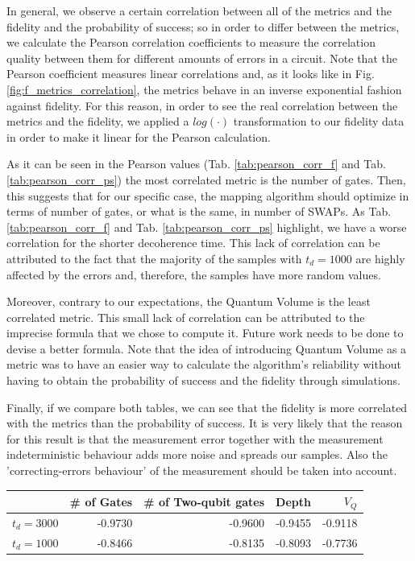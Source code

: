 In general, we observe a certain correlation between all of the metrics and the fidelity and the probability of success; so in order to differ between the metrics, we calculate the Pearson correlation coefficients to measure the correlation quality between them for different amounts of errors in a circuit.
Note that the Pearson coefficient measures linear correlations and, as it looks like in Fig. \ref{fig:f_metrics_correlation}, the metrics behave in an inverse exponential fashion against fidelity.
For this reason, in order to see the real correlation between the metrics and the fidelity, we applied a \(log(\cdot)\) transformation to our fidelity data in order to make it linear for the Pearson calculation.


As it can be seen in the Pearson values (Tab. \ref{tab:pearson_corr_f} and Tab. \ref{tab:pearson_corr_ps}) the most correlated metric is the number of gates.
Then, this suggests that for our specific case, the mapping algorithm should optimize in terms of number of gates, or what is the same, in number of SWAPs.
As Tab. \ref{tab:pearson_corr_f} and Tab. \ref{tab:pearson_corr_ps} highlight, we have a worse correlation for the shorter decoherence time.
This lack of correlation can be attributed to the fact that the majority of the samples with \(t_d = 1000\) are highly affected by the errors and, therefore, the samples have more random values.

Moreover, contrary to our expectations, the Quantum Volume is the least correlated metric.
This small lack of correlation can be attributed to the imprecise formula that we chose to compute it.
Future work needs to be done to devise a better formula.
Note that the idea of introducing Quantum Volume as a metric was to have an easier way to calculate the algorithm's reliability without having to obtain the probability of success and the fidelity through simulations.

Finally, if we compare both tables, we can see that the fidelity is more correlated with the metrics than the probability of success.
It is very likely that the reason for this result is that the measurement error together with the measurement indeterministic behaviour  adds more noise and spreads our samples.
Also the 'correcting-errors behaviour' of the measurement should be taken into account.

\begin{center}
\begin{tabular}{lrrrr}
\hline
 & \# of Gates & \# of Two-qubit gates & Depth & \(V_Q\)\\
\hline
\(t_d = 3000\) & -0.9730 & -0.9600 & -0.9455 & -0.9118\\
\(t_d = 1000\) & -0.8466 & -0.8135 & -0.8093 & -0.7736\\
\hline
\end{tabular}
\end{center}


